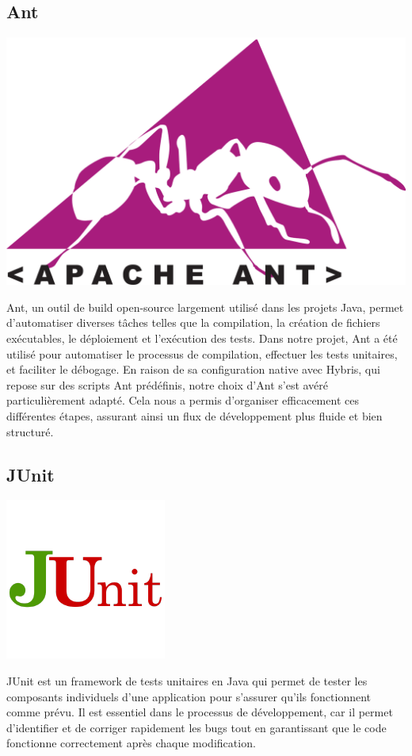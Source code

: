 \subsection*{Ant}
\begin{center}
    \centering
    \includegraphics[scale=0.05]{Figures/Ant.png}

\end{center}
Ant, un outil de build open-source largement utilisé dans les projets Java, permet d’automatiser diverses tâches telles que la compilation, la création de fichiers exécutables, le déploiement et l'exécution des tests. Dans notre projet, Ant a été utilisé pour automatiser le processus de compilation, effectuer les tests unitaires, et faciliter le débogage. En raison de sa configuration native avec Hybris, qui repose sur des scripts Ant prédéfinis, notre choix d'Ant s'est avéré particulièrement adapté. Cela nous a permis d'organiser efficacement ces différentes étapes, assurant ainsi un flux de développement plus fluide et bien structuré.

\subsection*{JUnit}
\begin{center}
    \centering
    \includegraphics[scale=0.5]{Figures/junit.png}
    \label{fig:processus}
\end{center}
JUnit est un framework de tests unitaires en Java qui permet de tester les composants individuels d'une application pour s'assurer qu'ils fonctionnent comme prévu. Il est essentiel dans le processus de développement, car il permet d'identifier et de corriger rapidement les bugs tout en garantissant que le code fonctionne correctement après chaque modification.

